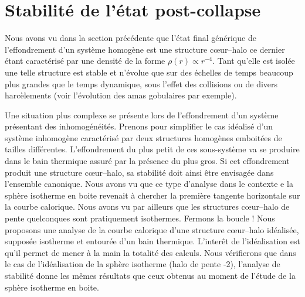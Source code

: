 \section{Stabilité de l'état post-collapse\label{Sec::ToyModel}}

Nous avons vu dans la section précédente que l'état final générique de l'effondrement d'un système homogène est une structure c\oe ur--halo ce dernier étant caractérisé par une densité de la forme $\rho(r)\propto r^{-4}$.  Tant qu'elle est isolée une telle structure est stable et n'évolue que sur des échelles de temps beaucoup plus grandes que le temps dynamique, sous l'effet des collisions ou de divers harcèlements (voir l'évolution des amas gobulaires par exemple). 

Une situation plus complexe se présente lors de l'effondrement d'un système présentant des inhomogénéités. Prenons pour simplifier le cas idéalisé d'un système inhomogène caractérisé par deux structures homogènes emboitées de tailles différentes. L'effondrement du plus petit de ces sous-système va se produire dans le bain thermique assuré par la présence du plus gros. Si cet effondrement produit une structure c\oe ur--halo, sa stabilité doit ainsi être envisagée dans l'ensemble canonique. Nous avons vu que ce type d'analyse dans le contexte e la sphère isotherme en boite revenait à chercher la première tangente horizontale sur la courbe calorique. Nous avons vu par ailleurs que les structures c\oe ur--halo de pente quelconques sont pratiquement isothermes. Fermons la boucle ! Nous proposons une analyse de la courbe calorique d'une structure c\oe ur--halo idéalisée, supposée isotherme et entourée d'un bain thermique. L'interêt de l'idéalisation est qu'il permet de mener à la main la totalité des calculs. Nous vérifierons que dans le cas de l'idéalisation de la sphère isotherme (halo de pente -2), l'analyse de stabilité donne les mêmes résultats que ceux obtenus au moment de l'étude de la sphère isotherme en boite.

